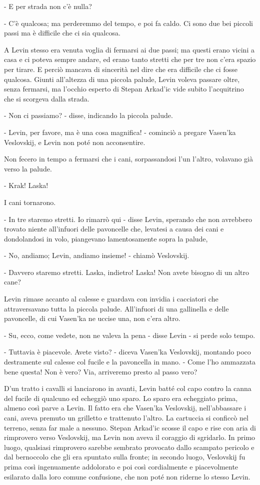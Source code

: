 - E per strada non c'è nulla? 

- C'è qualcosa; ma perderemmo del tempo, e poi fa caldo. Ci sono due bei piccoli passi ma è difficile che ci sia qualcosa. 

A Levin stesso era venuta voglia di fermarsi ai due passi; ma questi erano vicini a casa e ci poteva sempre andare, ed erano tanto stretti che per tre non c'era spazio per tirare. E perciò mancava di sincerità nel dire che era difficile che ci fosse qualcosa. Giunti all'altezza di una piccola palude, Levin voleva passare oltre, senza fermarsi, ma l'occhio esperto di Stepan Arkad'ic vide subito l'acquitrino che si scorgeva dalla strada. 

- Non ci passiamo? - disse, indicando la piccola palude. 

- Levin, per favore, ma è una cosa magnifica! - cominciò a pregare Vasen'ka Veslovskij, e Levin non poté non acconsentire. 

Non fecero in tempo a fermarsi che i cani, sorpassandosi l'un l'altro, volavano già verso la palude. 

- Krak! Laska! 

I cani tornarono. 

- In tre staremo stretti. Io rimarrò qui - disse Levin, sperando che non avrebbero trovato niente all'infuori delle pavoncelle che, levatesi a causa dei cani e dondolandosi in volo, piangevano lamentosamente sopra la palude, 

- No, andiamo; Levin, andiamo insieme! - chiamò Veslovskij. 

- Davvero staremo stretti. Laska, indietro! Laska! Non avete bisogno di un altro cane? 

Levin rimase accanto al calesse e guardava con invidia i cacciatori che attraversavano tutta la piccola palude. All'infuori di una gallinella e delle pavoncelle, di cui Vasen'ka ne uccise una, non c'era altro. 

- Su, ecco, come vedete, non ne valeva la pena - disse Levin - si perde solo tempo. 

- Tuttavia è piacevole. Avete visto? - diceva Vasen'ka Veslovskij, montando poco destramente sul calesse col fucile e la pavoncella in mano. - Come l'ho ammazzata bene questa! Non è vero? Via, arriveremo presto al passo vero? 

D'un tratto i cavalli si lanciarono in avanti, Levin batté col capo contro la canna del fucile di qualcuno ed echeggiò uno sparo. Lo sparo era echeggiato prima, almeno così parve a Levin. Il fatto era che Vasen'ka Veslovskij, nell'abbassare i cani, aveva premuto un grilletto e trattenuto l'altro. La cartuccia si conficcò nel terreno, senza far male a nessuno. Stepan Arkad'ic scosse il capo e rise con aria di rimprovero verso Veslovskij, ma Levin non aveva il coraggio di sgridarlo. In primo luogo, qualsiasi rimprovero sarebbe sembrato provocato dallo scampato pericolo e dal bernoccolo che gli era spuntato sulla fronte; in secondo luogo, Veslovskij fu prima così ingenuamente addolorato e poi così cordialmente e piacevolmente esilarato dalla loro comune confusione, che non poté non riderne lo stesso Levin. 

